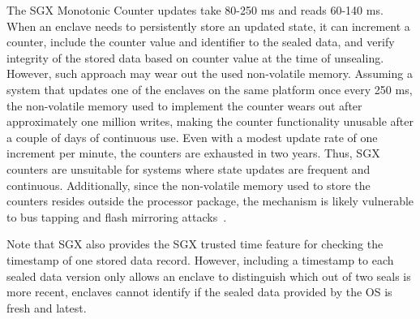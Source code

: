 The SGX Monotonic Counter updates take 80-250 ms and reads 60-140 ms. When an enclave needs to persistently store an updated state, it can increment a counter, include the counter value and identifier to the sealed data, and verify integrity of the stored data based on counter value at the time of unsealing. However, such approach may wear out the used non-volatile memory. Assuming a system that updates one of the enclaves on the same platform once every 250 ms, the non-volatile memory used to implement the counter wears out after approximately one million writes, making the counter functionality unusable after a couple of days of continuous use. Even with a modest update rate of one increment per minute, the counters are exhausted in two years. Thus, SGX counters are unsuitable for systems where state updates are frequent and continuous. Additionally, since the non-volatile memory used to store the counters resides outside the processor package, the mechanism is likely vulnerable to bus tapping and flash mirroring attacks~\cite{}.

Note that SGX also provides the SGX trusted time feature for checking the timestamp of one stored data record. However, including a timestamp to each sealed data version only allows an enclave to distinguish which out of two seals is more recent, enclaves cannot identify if the sealed data provided by the OS is fresh and latest.





